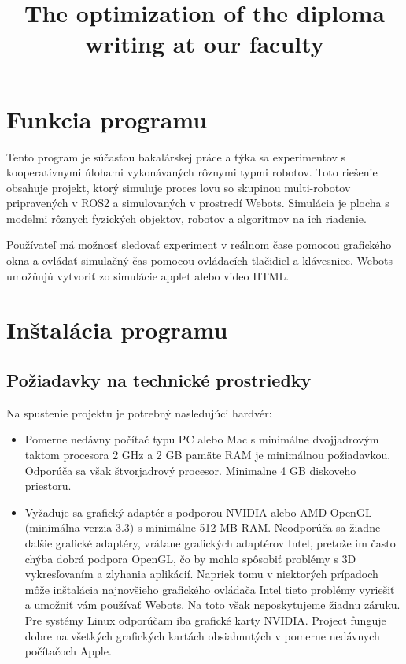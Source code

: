 \documentclass[a4paper]{feidippp}
\title{The optimization of the diploma writing at our faculty}
\begin{document}




\titulnastrana

\newpage


\tableofcontents

\newpage

\listoffigures

\newpage


\setcounter{page}{1}

\section{Funkcia programu}

Tento program je súčasťou bakalárskej práce a týka sa experimentov s kooperatívnymi úlohami vykonávaných rôznymi typmi
 robotov. Toto riešenie obsahuje projekt, ktorý simuluje proces lovu so skupinou multi-robotov pripravených v ROS2 a 
 simulovaných v prostredí Webots. Simulácia je plocha s modelmi rôznych fyzických objektov, robotov a algoritmov na ich riadenie.

\vspace{3mm}

\justifying
\noindent
Používateľ má možnosť sledovať experiment v reálnom čase pomocou grafického okna a ovládať simulačný čas pomocou ovládacích tlačidiel a klávesnice. Webots umožňujú vytvoriť zo simulácie applet alebo video HTML.

\section{Inštalácia programu}

\subsection{Požiadavky na technické prostriedky}
Na spustenie projektu je potrebný nasledujúci hardvér:
\begin{itemize}
    \item Pomerne nedávny počítač typu PC alebo Mac s minimálne dvojjadrovým taktom procesora 2 GHz a 2 GB pamäte RAM je minimálnou požiadavkou. Odporúča sa však štvorjadrový procesor. Minimalne 4 GB diskoveho priestoru.
    \item Vyžaduje sa grafický adaptér s podporou NVIDIA alebo AMD OpenGL (minimálna verzia 3.3) s minimálne 512 MB RAM. Neodporúča sa žiadne ďalšie grafické adaptéry, vrátane grafických adaptérov Intel, pretože im často chýba dobrá podpora OpenGL, čo by mohlo spôsobiť problémy s 3D vykresľovaním a zlyhania aplikácií. Napriek tomu v niektorých prípadoch môže inštalácia najnovšieho grafického ovládača Intel tieto problémy vyriešiť a umožniť vám používať Webots. Na toto však neposkytujeme žiadnu záruku. Pre systémy Linux odporúčam iba grafické karty NVIDIA. Project funguje dobre na všetkých grafických kartách obsiahnutých v pomerne nedávnych počítačoch Apple.
\end{itemize}
\end{document}
